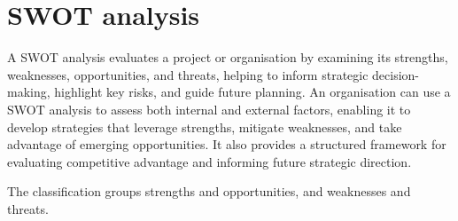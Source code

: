 \section{SWOT analysis}

A SWOT analysis evaluates a project or organisation by examining its strengths, weaknesses, opportunities, and threats, helping to inform strategic decision-making, highlight key risks, and guide future planning. An organisation can use a SWOT analysis to assess both internal and external factors, enabling it to develop strategies that leverage strengths, mitigate weaknesses, and take advantage of emerging opportunities. It also provides a structured framework for evaluating competitive advantage and informing future strategic direction.


The classification groups strengths and opportunities, and weaknesses and threats.


